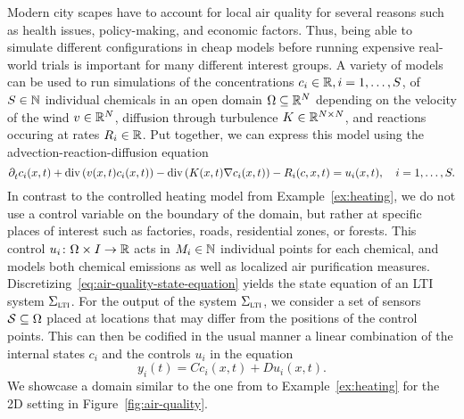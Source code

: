 \begin{example}
    Modern city scapes have to account for local air quality for several reasons such as health issues, policy-making, and economic factors.
    Thus, being able to simulate different configurations in cheap models before running expensive real-world trials is important for many different interest groups.
    A variety of models can be used to run simulations of the concentrations $c_i \in \bb{R}, i = 1, \dots, S$, of $S \in \bb{N}$ individual chemicals in an open domain $\Omega \subseteq \bb{R}^N$ depending on the velocity of the wind $v \in \bb{R}^N$, diffusion through turbulence $K \in \bb{R}^{N \times N}$, and reactions occuring at rates $R_i \in \bb{R}$.
    Put together, we can express this model using the advection-reaction-diffusion equation
    \begin{equation}\label{eq:air-quality-state-equation}
        \pd[t]{} c_i(x, t) + \dvg \left( v(x, t) c_i(x, t) \right) - \dvg \left( K(x, t) \nabla c_i(x, t) \right) - R_i(c, x, t) = u_i(x, t),\quad i = 1, \dots, S.
    \end{equation}
    In contrast to the controlled heating model from Example~\ref{ex:heating}, we do not use a control variable on the boundary of the domain, but rather at specific places of interest such as factories, roads, residential zones, or forests.
    This control $u_i \colon \Omega \times I \to \bb{R}$ acts in $M_i \in \bb{N}$ individual points for each chemical, and models both chemical emissions as well as localized air purification measures.
    Discretizing~\eqref{eq:air-quality-state-equation} yields the state equation of an \ac{LTI} system $\Sigma_{\msc{lti}}$.
    For the output of the system $\Sigma_{\msc{lti}}$, we consider a set of sensors $\mcl{S} \subseteq \Omega$ placed at locations that may differ from the positions of the control points.
    This can then be codified in the usual manner a linear combination of the internal states $c_i$ and the controls $u_i$ in the equation
    \begin{equation*}
        y_i(t) = C c_i(x, t) + D u_i(x, t).
    \end{equation*}
    We showcase a domain similar to the one from to Example~\ref{ex:heating} for the 2D setting in Figure~\ref{fig:air-quality}.

    \begin{figure}[h]
        \centering
\end{figure}
\end{example}
